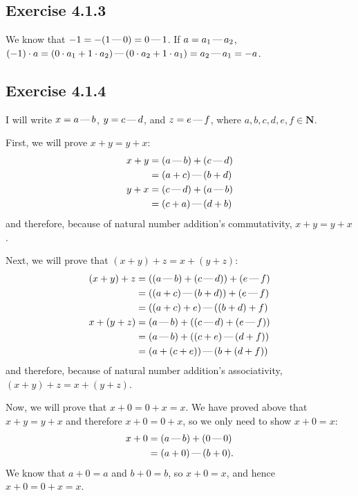 \documentclass[12pt, oneside]{book}
\newcommand{\formalminus}{\, \text{\textemdash} \,}
\begin{document}
	\subsection*{Exercise 4.1.3}

	We know that $-1 = -(1 \formalminus 0) = 0 \formalminus 1$. If $a = a_1 \formalminus a_2$, $(-1) \cdot a = (0 \cdot a_1 + 1 \cdot a_2) \formalminus (0 \cdot a_2 + 1 \cdot a_1) = a_2 \formalminus a_1 = -a$.

	\subsection*{Exercise 4.1.4}

	I will write $x = a \formalminus b$, $y = c \formalminus d$, and $z = e \formalminus f$, where $a, b, c, d, e, f \in \mathbf{N}$.

	First, we will prove $x + y = y + x$:
	\begin{align*}
		x + y &= (a \formalminus b) + (c \formalminus d) \\
		&= (a + c) \formalminus (b + d) \\
		y + x &= (c \formalminus d) + (a \formalminus b) \\
		&= (c + a) \formalminus (d + b)
	\end{align*}
	and therefore, because of natural number addition's commutativity, $x + y = y + x$.

	Next, we will prove that $(x + y) + z = x + (y + z)$:
	\begin{align*}
		(x + y) + z &= ((a \formalminus b) + (c \formalminus d)) + (e \formalminus f) \\
		&= ((a + c) \formalminus (b + d)) + (e \formalminus f) \\
		&= ((a + c) + e) \formalminus ((b + d) + f) \\
		x + (y + z) &= (a \formalminus b) + ((c \formalminus d) + (e \formalminus f)) \\
		&= (a \formalminus b) + ((c + e) \formalminus (d + f)) \\
		&= (a + (c + e)) \formalminus (b + (d + f))
	\end{align*}
	and therefore, because of natural number addition's associativity, $(x + y) + z = x + (y + z)$.

	Now, we will prove that $x + 0 = 0 + x = x$. We have proved above that $x + y = y + x$ and therefore $x + 0 = 0 + x$, so we only need to show $x + 0 = x$:
	\[\begin{split}
		x + 0 &= (a \formalminus b) + (0 \formalminus 0) \\
		&= (a + 0) \formalminus (b + 0).
	\end{split}\]
	We know that $a + 0 = a$ and $b + 0 = b$, so $x + 0 = x$, and hence $x + 0 = 0 + x = x$.
\end{document}
